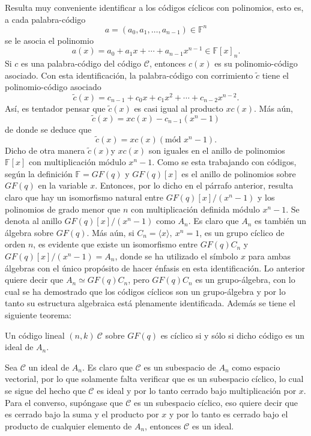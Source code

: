 Resulta muy conveniente identificar a los códigos cíclicos con polinomios, esto es, a cada palabra-código
\[ a = (a_0, a_1, \dots , a_{n-1}) \in \mathds{F}^n \] se le asocia el polinomio \[ a(x) = a_0 + a_1x+ \cdots + a_{n-1}x^{n-1} \in \mathds{F}[x]_n .\] Si $c$ es una palabra-código del código $\mathcal{C}$, entonces $c(x)$ es su polinomio-código asociado. Con esta identificación, la palabra-código con corrimiento $\tilde{c}$ tiene el polinomio-código asociado \[ \tilde{c}(x) = c_{n-1} + c_0x + c_1x^2 + \cdots + c_{n-2}x^{n-2}. \] Así, es tentador pensar que $\tilde{c}(x) $ es casi igual al producto $xc(x)$. Más aún, 
\[ \tilde{c}(x) = xc(x) - c_{n-1}(x^n -1)  \] de donde se deduce que \[ \tilde{c}(x) = xc(x) (\mbox{mód } x^n-1) .\] Dicho de otra manera $\tilde{c}(x)$y $xc(x)$ son iguales en el anillo de polinomios $\mathds{F}[x]$ con multiplicación módulo $x^n-1$. Como se esta trabajando con códigos, según la definición $\mathds{F} = GF(q) $ y $GF(q)[x]$ es el anillo de polinomios sobre $GF(q)$ en la variable $x$. Entonces, por lo dicho en el párrafo anterior, resulta claro que hay un isomorfismo natural entre $GF(q)[x]/(x^n-1)$ y los polinomios de grado menor que $n$ con multiplicación definida módulo $x^n-1$. Se denota al anillo $GF(q)[x]/(x^n-1)$ como $A_n$. Es claro que $A_n$ es también un álgebra sobre $GF(q)$. Más aún, si $C_n = \langle x \rangle,\ x^n =1$, es un grupo cíclico de orden $n$, es evidente que existe un isomorfismo entre $GF(q)C_n$ y $GF(q)[x]/(x^n-1) = A_n$, donde se ha utilizado el símbolo $x$ para ambas álgebras con el único propósito de hacer énfasis en esta identificación.
Lo anterior quiere decir que $A_n \simeq GF(q)C_n$, pero $GF(q)C_n$ es un grupo-álgebra, con lo cual se ha demostrado que los códigos cíclicos son un grupo-álgebra y por lo tanto su estructura algebraica está plenamente identificada. Además se tiene el siguiente teorema:
\begin{teorema}
Un código lineal $(n,k) \ \mathcal{C}$ sobre $GF(q)$ es cíclico si y sólo si dicho código es un ideal de $A_n$.
\end{teorema}
\begin{proof*}
Sea $\mathcal{C}$ un ideal de $A_n$. Es claro que $\mathcal{C}$ es un subespacio de $A_n$ como espacio vectorial, por lo que solamente falta verificar que es un subespacio cíclico, lo cual se sigue del hecho que $\mathcal{C}$ es ideal y por lo tanto cerrado bajo multiplicación por $x$.
Para el converso, supóngase que $\mathcal{C}$ es un subespacio cíclico, eso quiere decir que es cerrado bajo la suma y el producto por $x$ y por lo tanto es cerrado bajo el producto de cualquier elemento de $A_n$, entonces $\mathcal{C}$ es un ideal.
\end{proof*}
